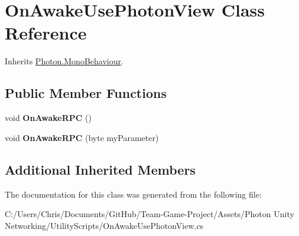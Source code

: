 \hypertarget{class_on_awake_use_photon_view}{}\section{On\+Awake\+Use\+Photon\+View Class Reference}
\label{class_on_awake_use_photon_view}


Inherits \hyperlink{class_photon_1_1_mono_behaviour}{Photon.\+Mono\+Behaviour}.

\subsection*{Public Member Functions}
\begin{DoxyCompactItemize}
\item 
void {\bfseries On\+Awake\+R\+PC} ()\hypertarget{class_on_awake_use_photon_view_aff099e6fc255e9fd0ade99a97df6d21c}{}\label{class_on_awake_use_photon_view_aff099e6fc255e9fd0ade99a97df6d21c}

\item 
void {\bfseries On\+Awake\+R\+PC} (byte my\+Parameter)\hypertarget{class_on_awake_use_photon_view_a3cbff5428306b93a893524f2d189c0d9}{}\label{class_on_awake_use_photon_view_a3cbff5428306b93a893524f2d189c0d9}

\end{DoxyCompactItemize}
\subsection*{Additional Inherited Members}


The documentation for this class was generated from the following file\+:\begin{DoxyCompactItemize}
\item 
C\+:/\+Users/\+Chris/\+Documents/\+Git\+Hub/\+Team-\/\+Game-\/\+Project/\+Assets/\+Photon Unity Networking/\+Utility\+Scripts/On\+Awake\+Use\+Photon\+View.\+cs\end{DoxyCompactItemize}
